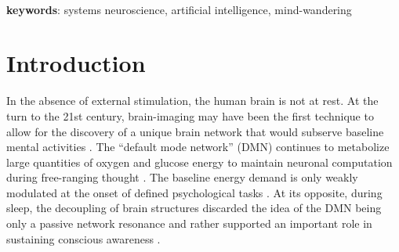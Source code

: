 \documentclass[10pt,letterpaper]{article}
\begin{document}
\textbf{\\keywords}: systems neuroscience, artificial intelligence, mind-wandering



\section{Introduction}
%
In the absence of external stimulation, the human brain is not at rest.
At the turn to the 21st century,
brain-imaging may have been the first technique
to allow for the discovery of a unique brain network that would subserve
baseline mental activities
\citep{raichle2001pnas, randy2008, bzdok2015resting}.
The ``default mode network'' (DMN) continues
to metabolize large quantities of
oxygen and glucose energy to maintain
neuronal computation
during free-ranging thought
\citep{kenet2003spontaneously, fiser2004small}.
The baseline energy demand is only weakly modulated
at the onset of defined psychological tasks \citep{raichle_baseline}.
At its opposite, during sleep, the
decoupling of brain structures discarded the idea of the DMN being
only a passive network resonance and rather supported an
important role in sustaining conscious awareness \citep{horovitz2009decoupling}.
\end{document}
